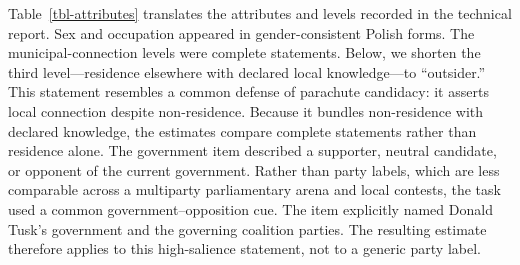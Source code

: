 \documentclass[
  letterpaper,
  DIV=11,
  numbers=noendperiod]{scrartcl}
\newcommand{\criticmarkupadd}[1]{#1}
\newcommand{\criticmarkuprm}[1]{}
\begin{document}
Table~\ref{tbl-attributes} translates the attributes and levels recorded
in the technical report. Sex and occupation appeared in
gender-consistent Polish forms. The
\criticmarkupadd{municipal-connection levels were complete statements.
Below, we shorten the third level---residence elsewhere with declared
local knowledge---to ``outsider.'' This statement resembles a common
defense of parachute candidacy: it asserts local connection despite
non-residence. Because it bundles non-residence with declared knowledge,
the estimates compare complete statements rather than residence alone.
The }government item described a supporter, neutral candidate, or
opponent of the current government. \criticmarkupadd{Rather than party
labels, which are less comparable across a multiparty parliamentary
arena and local contests, the task used a common government--opposition
cue. }The \criticmarkuprm{municipal-connection levels were complete
statements, so each estimate compares the full wording rather than
residence separated from the outsider's declaration of local knowledge.
We use the outsider-with-local-knowledge statement as the AMCE reference
because it represents a plausible parachute-candidate claim rather than
an information-free outsider. If declared knowledge is rewarded, this
benchmark attenuates the resident--outsider contrasts; without a
separately randomized knowledge statement, the amount of attenuation is
unidentified. The government statement}\criticmarkupadd{item} explicitly
named Donald Tusk's government and the governing coalition
\criticmarkuprm{parties rather than ballot acronyms. This personalized
wording makes the}\criticmarkupadd{parties. The resulting} estimate
\criticmarkuprm{a}\criticmarkupadd{therefore applies to this}
high-salience \criticmarkuprm{benchmark for the government--opposition
divide,}\criticmarkupadd{statement,} not \criticmarkupadd{to }a generic
\criticmarkuprm{party-label effect. Because cue wording was not
randomized, the experiment does not establish an upper bound for
national-cue effects.}\criticmarkupadd{party label.}
\end{document}
